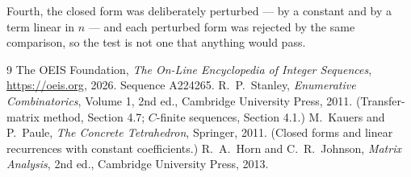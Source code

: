 \documentclass[11pt,a4paper]{article}
\theoremstyle{plain}
\theoremstyle{definition}
\begin{document}
Fourth, the closed form was deliberately perturbed --- by a constant and by a term linear in
$n$ --- and each perturbed form was rejected by the same comparison, so the test is not one
that anything would pass.

\begin{thebibliography}{9}
 The OEIS Foundation, \emph{The On-Line Encyclopedia of Integer
Sequences}, \url{https://oeis.org}, 2026. Sequence A224265.
 R.~P.~Stanley, \emph{Enumerative Combinatorics}, Volume 1, 2nd ed.,
Cambridge University Press, 2011. (Transfer-matrix method, Section 4.7; $C$-finite sequences,
Section 4.1.)
 M.~Kauers and P.~Paule, \emph{The Concrete Tetrahedron}, Springer, 2011.
(Closed forms and linear recurrences with constant coefficients.)
 R.~A.~Horn and C.~R.~Johnson, \emph{Matrix Analysis}, 2nd ed., Cambridge
University Press, 2013.
\end{thebibliography}
\end{document}
